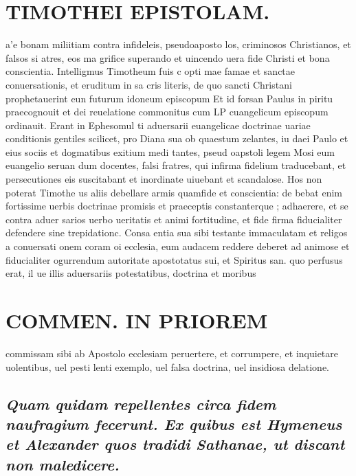 \documentclass{article}
\begin{document}
\begin{pages}
\section*{TIMOTHEI EPISTOLAM. }
\marginpar{[ p.39 ]}\pstart a’e bonam miliitiam contra infideleis, pseudoaposto los, criminosos Christianos, et falsos si atres, eos ma grifice superando et uincendo uera fide Christi et bona conscientia. Intelligmus Timotheum fuis c opti mae famae et sanctae conuersationis, et eruditum in sa cris literis, de quo sancti Christani prophetauerint eun futurum idoneum episcopum Et id forsan Paulus in piritu praecognouit et dei reuelatione commonitus cum LP cuangelicum episcopum ordinauit. Erant in Ephesomul ti aduersarii euangelicae doctrinae uariae conditionis gentiles scilicet, pro Diana sua ob quaestum zelantes, iu daei Paulo et eius sociis et dogmatibus exitium medi tantes, pseud oapstoli legem Mosi eum euangelio seruan dum docentes, falsi fratres, qui infirma fidelium traducebant, et persecutiones eis suscitabant et inordinate uiuebant et scandalose. Hos non poterat Timothe us aliis debellare armis quamfide et conscientia: de bebat enim fortissime uerbis doctrinae promisis et praeceptis constanterque ; adhaerere, et se contra aduer sarios uerbo ueritatis et animi fortitudine, et fide firma fiducialiter defendere sine trepidationc. Consa entia sua sibi testante immaculatam et religos a conuersati onem coram oi ecclesia, eum audacem reddere deberet ad animose et fiducialiter ogurrendum autoritate apostotatus sui, et Spiritus san. quo perfusus erat, il ue illis aduersariis potestatibus, doctrina et moribus  \pend
\section*{COMMEN. IN PRIOREM }
\marginpar{[ p.40 ]}\pstart commissam sibi ab Apostolo ecclesiam peruertere, et corrumpere, et inquietare uolentibus, uel pesti lenti exemplo, uel falsa doctrina, uel insidiosa delatione.  \pend
{}
{}
\subsection*{\textit{Quam quidam repellentes circa fidem naufragium fecerunt. Ex quibus est Hymeneus et Alexander quos tradidi Sathanae, ut discant non maledicere. }}
{}

\end{pages}
\end{document}
